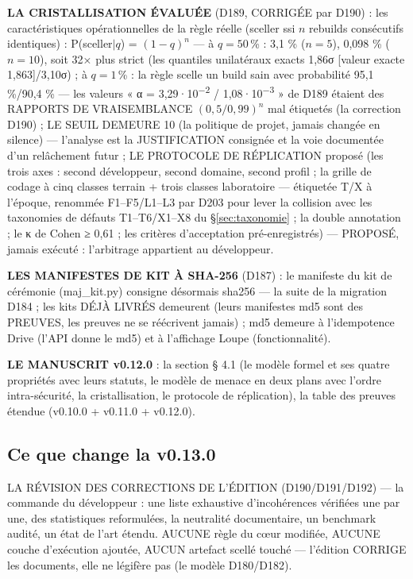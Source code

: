\textbf{LA CRISTALLISATION ÉVALUÉE} (D189, CORRIGÉE par D190) : les
caractéristiques opérationnelles de la règle réelle (sceller ssi $n$
rebuilds consécutifs identiques) : P(sceller$|q$) = $(1-q)^n$ — à
$q = 50$\,\% : 3,1 \% ($n{=}5$), 0,098 \% ($n{=}10$), soit 32× plus
strict (les quantiles unilatéraux exacts 1,86σ [valeur exacte
1,863]/3,10σ) ; à $q = 1$\,\% :
la règle scelle un build sain avec probabilité 95,1 \%/90,4 \% — les
valeurs « α = 3,29·10\textsuperscript{−2} / 1,08·10\textsuperscript{−3} »
de D189 étaient des RAPPORTS DE VRAISEMBLANCE $(0,5/0,99)^n$ mal
étiquetés (la correction D190) ; LE SEUIL DEMEURE 10 (la politique de projet, jamais changée
en silence) — l'analyse est la JUSTIFICATION consignée et la voie
documentée d'un relâchement futur ; LE PROTOCOLE DE RÉPLICATION proposé
(les trois axes : second développeur, second domaine, second profil ;
la grille de codage à cinq classes terrain + trois classes laboratoire
— étiquetée T/X à l'époque, renommée F1--F5/L1--L3 par D203 pour
lever la collision avec les taxonomies de défauts T1--T6/X1--X8 du
§\ref{sec:taxonomie} ; la
double annotation ; le κ de Cohen ≥ 0,61 ; les critères d'acceptation
pré-enregistrés) — PROPOSÉ, jamais exécuté : l'arbitrage appartient au
développeur.

\textbf{LES MANIFESTES DE KIT À SHA-256} (D187) : le manifeste du kit de
cérémonie (maj\_kit.py) consigne désormais sha256 — la suite de la
migration D184 ; les kits DÉJÀ LIVRÉS demeurent (leurs manifestes md5
sont des PREUVES, les preuves ne se réécrivent jamais) ; md5 demeure à
l'idempotence Drive (l'API donne le md5) et à l'affichage Loupe
(fonctionnalité).

\textbf{LE MANUSCRIT v0.12.0} : la section § 4.1 (le modèle formel et
ses quatre propriétés avec leurs statuts, le modèle de menace en deux
plans avec l'ordre intra-sécurité, la cristallisation, le protocole de
réplication), la table des preuves étendue (v0.10.0 + v0.11.0 + v0.12.0).

\subsection{Ce que change la v0.13.0}\label{sec:nouveautes130}

LA RÉVISION DES CORRECTIONS DE L'ÉDITION (D190/D191/D192) — la commande du
développeur : une liste exhaustive d'incohérences vérifiées une par une, des
statistiques reformulées, la neutralité documentaire, un benchmark audité, un
état de l'art étendu. AUCUNE règle du cœur modifiée, AUCUNE couche d'exécution
ajoutée, AUCUN artefact scellé touché — l'édition CORRIGE les documents, elle
ne légifère pas (le modèle D180/D182).

